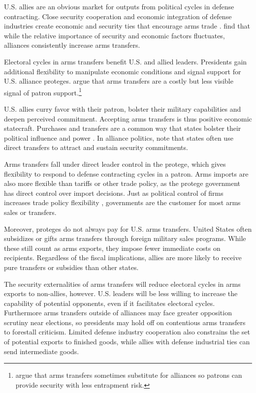\documentclass[12pt]{article}
\begin{document}
U.S. allies are an obvious market for outputs from political cycles in defense contracting.
Close security cooperation and economic integration of defense industries create economic and security ties that encourage arms trade \citep{Bitzinger1994}. 
\citet{Thurneretal2019} find that while the relative importance of security and economic factors fluctuates, alliances consistently increase arms transfers.


Electoral cycles in arms transfers benefit U.S. and allied leaders.
Presidents gain additional flexibility to manipulate economic conditions and signal support for U.S. alliance proteges. 
\citet{McManusYarhi-Milo2017} argue that arms transfers are a costly but less visible signal of patron support.\footnote{\citet{Yarhi-Miloetal2016} argue that arms transfers sometimes substitute for alliances so patrons can provide security with less entrapment risk.}


U.S. allies curry favor with their patron, bolster their military capabilities and deepen perceived commitment.
Accepting arms transfers is thus positive economic statecraft. 
Purchases and transfers are a common way that states bolster their political influence and power \citep[pg. 42-3]{Baldwin2020}.
In alliance politics, \citet[pg. 184-5]{IkenberryGrieco2003} note that states often use direct transfers to attract and sustain security commitments.  


Arms transfers fall under direct leader control in the protege, which gives flexibility to respond to defense contracting cycles in a patron.
Arms imports are also more flexible than tariffs or other trade policy, as the protege government has direct control over import decisions.
Just as political control of firms increases trade policy flexibility \citep{Davisetal2019}, governments are the customer for most arms sales or transfers. 


Moreover, proteges do not always pay for U.S. arms transfers.
United States often subsidizes or gifts arms transfers through foreign military sales programs. 
While these still count as arms exports, they impose fewer immediate costs on recipients.
Regardless of the fiscal implications, allies are more likely to receive pure transfers or subsidies than other states.


The security externalities of arms transfers will reduce electoral cycles in arms exports to non-allies, however. 
U.S. leaders will be less willing to increase the capability of potential opponents, even if it facilitates electoral cycles.
Furthermore arms transfers outside of alliances may face greater opposition scrutiny near elections, so presidents may hold off on contentious arms transfers to forestall criticism.
Limited defense industry cooperation also constrains the set of potential exports to finished goods, while allies with defense industrial ties can send intermediate goods.
\end{document}
